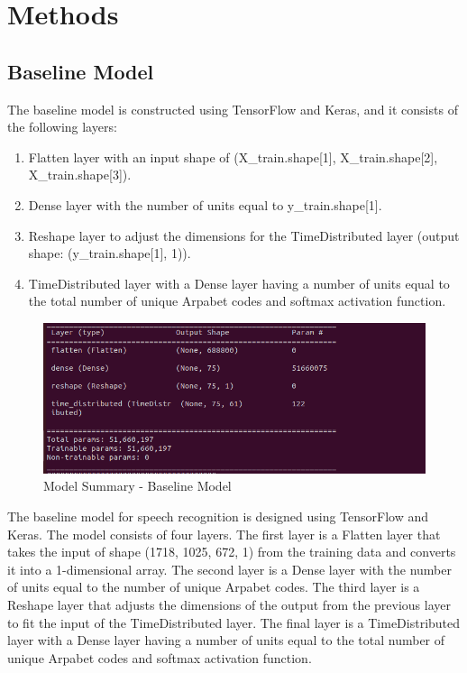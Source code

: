 \documentclass[12pt]{article}
\begin{document}
\section{Methods}

\subsection{Baseline Model}

The baseline model is constructed using TensorFlow and Keras, and it consists of the following layers:

\begin{enumerate}
  \item Flatten layer with an input shape of (X\_train.shape[1], X\_train.shape[2], X\_train.shape[3]).
  \item Dense layer with the number of units equal to y\_train.shape[1].
  \item Reshape layer to adjust the dimensions for the TimeDistributed layer (output shape: (y\_train.shape[1], 1)).
  \item TimeDistributed layer with a Dense layer having a number of units equal to the total number of unique Arpabet codes and softmax activation function.
\end{enumerate}


\begin{figure}[ht]
  \centering
  \includegraphics[width=.97\textwidth]{figures/ANN.png}
  \caption{Model Summary - Baseline Model}
  \label{fig:overview_architecture}
\end{figure}


The baseline model for speech recognition is designed using TensorFlow and Keras. The model consists of four layers. The first layer is a Flatten layer that takes the input of shape (1718, 1025, 672, 1) from the training data and converts it into a 1-dimensional array. The second layer is a Dense layer with the number of units equal to the number of unique Arpabet codes. The third layer is a Reshape layer that adjusts the dimensions of the output from the previous layer to fit the input of the TimeDistributed layer. The final layer is a TimeDistributed layer with a Dense layer having a number of units equal to the total number of unique Arpabet codes and softmax activation function.
\end{document}
